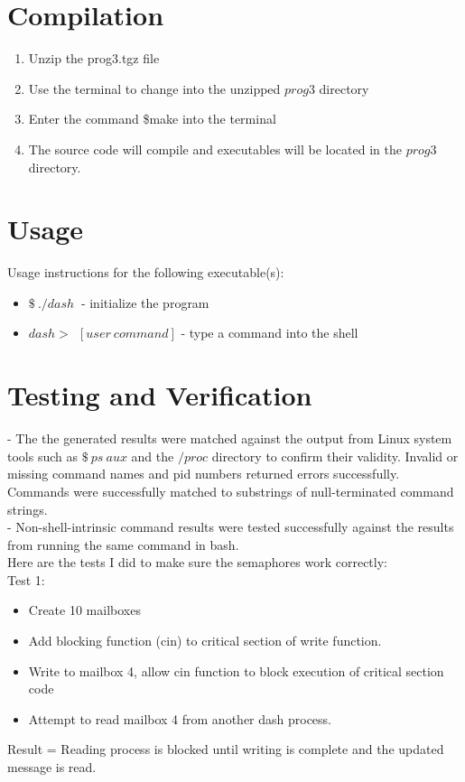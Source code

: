 \documentclass{article}
\begin{document}
\section{Compilation}

\begin{enumerate}
\item Unzip the prog3.tgz file
\item Use the terminal to change into the unzipped $prog3$ directory
\item Enter the command \$make into the terminal
\item The source code will compile and executables will be located in the $prog3$ directory.
\end{enumerate}

\section{Usage}

Usage instructions for the following executable(s):
\begin{itemize}
\item $\$\ ./dash\ $ - initialize the program
\item $dash>\ \ [user\ command]$ - type a command into the shell

\end{itemize}


\section{Testing and Verification}
- The the generated results were matched against the output from Linux system tools such as $\$\ ps\ aux$ and the $/proc$ directory to  confirm their validity.  Invalid or missing command names and pid numbers returned errors successfully.  Commands were successfully matched to substrings of null-terminated command strings.\\
- Non-shell-intrinsic command results were tested successfully against the results from running the same command in bash.\\

Here are the tests I did to make sure the semaphores work correctly:\\

Test 1:
\begin{itemize}
\item Create 10 mailboxes
\item Add blocking function (cin) to critical section of write function.
\item Write to mailbox 4, allow cin function to block execution of critical section code
\item Attempt to read mailbox 4 from another dash process.
\end{itemize}
Result = Reading process is blocked until writing is complete and the updated message is read.\\
\end{document}
